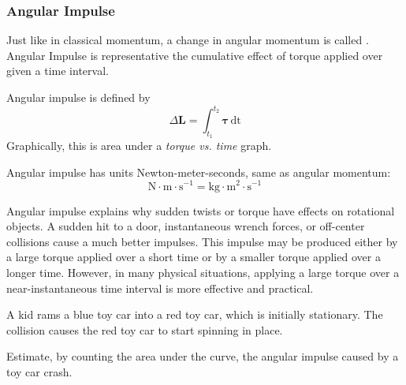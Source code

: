\subsubsection*{Angular Impulse}
Just like in classical momentum, a change in angular momentum is called . Angular Impulse is representative the cumulative effect of torque applied over given a time interval. 
\begin{mdframed}[frametitle = {Angular Impulse}, style = important]
  Angular impulse is defined by 
  \begin{equation}
  \Delta \mathbf {L} =\int _{t_{1}}^{t_{2}}{\boldsymbol {\tau }}\,\mathrm {dt}
  \end{equation}
Graphically, this is area under a \emph{torque vs. time} graph. 

Angular impulse has units Newton-meter-seconds, same as angular momentum:
$$\text{N}\cdot \text{m} \cdot \text{s}^{-1} = \text{kg} \cdot \text{m}^2\cdot \text{s}^{-1}$$
\end{mdframed}

Angular impulse explains why sudden twists or torque have effects on rotational objects. A sudden hit to a door, instantaneous wrench forces, or off-center collisions cause a much better impulses. This impulse may be produced either by a large torque applied over a short time or by a smaller torque applied over a longer time. However, in many physical situations, applying a large torque over a near-instantaneous time interval is more effective and practical.

\begin{Exercise}[title={Angular Impulse}, label={ex:ang_imp}]

  A kid rams a blue toy car into a red toy car, which is initially stationary. The collision causes the red toy car to start spinning in place.

  Estimate, by counting the area under the curve, the angular impulse caused by a toy car crash.

\end{Exercise}


